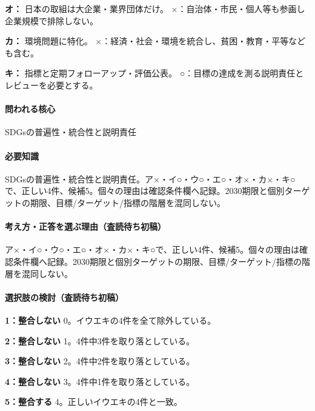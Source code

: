 \noindent\textbf{オ：} 日本の取組は大企業・業界団体だけ。 ×：自治体・市民・個人等も参画し企業規模で排除しない。\par

\noindent\textbf{カ：} 環境問題に特化。 ×：経済・社会・環境を統合し、貧困・教育・平等なども含む。\par

\noindent\textbf{キ：} 指標と定期フォローアップ・評価公表。 ○：目標の達成を測る説明責任とレビューを必要とする。\par

\paragraph{問われる核心} SDGsの普遍性・統合性と説明責任

\paragraph{必要知識} SDGsの普遍性・統合性と説明責任。ア×・イ○・ウ○・エ○・オ×・カ×・キ○で、正しい4件、候補5。個々の理由は確認条件欄へ記録。2030期限と個別ターゲットの期限、目標/ターゲット/指標の階層を混同しない。

\paragraph{考え方・正答を選ぶ理由（査読待ち初稿）} ア×・イ○・ウ○・エ○・オ×・カ×・キ○で、正しい4件、候補5。個々の理由は確認条件欄へ記録。2030期限と個別ターゲットの期限、目標/ターゲット/指標の階層を混同しない。

\paragraph{選択肢の検討（査読待ち初稿）}\mbox{}\par

\noindent\textbf{1：整合しない} 0。イウエキの4件を全て除外している。\par

\noindent\textbf{2：整合しない} 1。4件中3件を取り落としている。\par

\noindent\textbf{3：整合しない} 2。4件中2件を取り落としている。\par

\noindent\textbf{4：整合しない} 3。4件中1件を取り落としている。\par

\noindent\textbf{5：整合する} 4。正しいイウエキの4件と一致。\par

